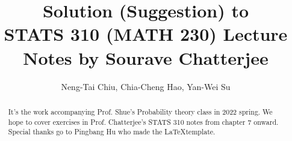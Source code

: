 \documentclass[a4paper,12pt]{article}
\author{Neng-Tai Chiu, Chia-Cheng Hao, Yan-Wei Su}
\title{Solution (Suggestion) to \\STATS 310 (MATH 230) Lecture Notes by Sourave Chatterjee}
\begin{document}
\maketitle

\begin{abstract}
	It's the work accompanying Prof. Shue's Probability theory class in 2022 spring. We hope to cover exercises in Prof. Chatterjee's STATS 310 notes  \cite{ChatterjeeSTATS310} from chapter 7 onward. 
	Special thanks go to Pingbang Hu \cite{PbbTemplate} who made the \LaTeX template.
\end{abstract}

\tableofcontents

\newpage
\setcounter{section}{4} %

\newpage
\appendix
\appendixpage



\newpage
\printbibliography
\end{document}

